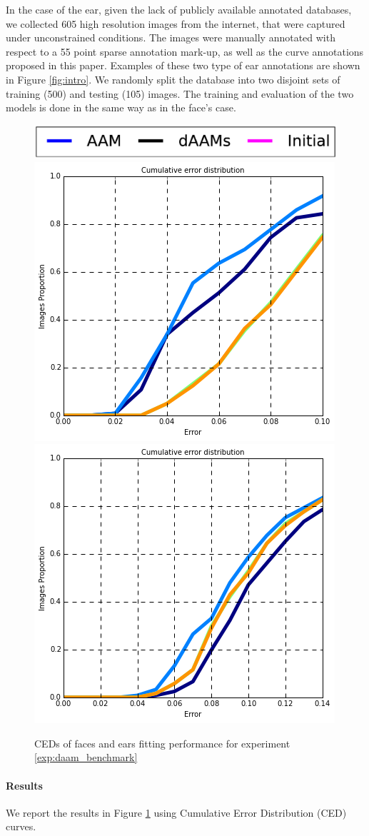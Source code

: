 In the case of the ear, given the lack of publicly available annotated databases, we collected 605 high resolution images from the internet, that were captured under unconstrained conditions. The images were manually annotated with respect to a 55 point sparse annotation mark-up, as well as the curve annotations proposed in this paper. Examples of these two type of ear annotations are shown in Figure \ref{fig:intro}. We randomly split the database into two disjoint sets of training (500) and testing (105) images. The training and evaluation of the two models is done in the same way as in the face's case.

\begin{figure}[b!]
    \centering
    \includegraphics[width=0.6\columnwidth]{resources/DAAMBenchmark/legend}
    \\
    \includegraphics[width=0.48\columnwidth]{resources/DAAMBenchmark/face}
    \includegraphics[width=0.48\columnwidth]{resources/DAAMBenchmark/ear}
    \caption{CEDs of faces and ears fitting performance for experiment \ref{exp:daam_benchmark}}
    \label{fig:daam_benchmark}
\end{figure}

\paragraph{Results} We report the results in Figure \ref{fig:daam_benchmark} using Cumulative Error Distribution (CED) curves. 

